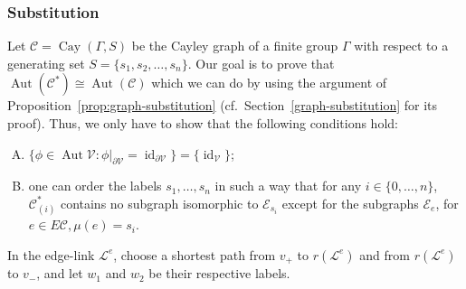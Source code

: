 \documentclass[10pt,a4paper]{amsart}
\newcommand{\cf}{cf.\ }
\theoremstyle{definition}
\newcommand{\cC}{\mathcal{C}}
\newcommand{\cL}{\mathcal{L}}
\newcommand{\cV}{\mathcal{V}}
\newcommand{\cE}{\mathcal{E}}
\DeclareMathOperator{\Cay}{Cay}
\DeclareMathOperator{\aut}{Aut}
\DeclareMathOperator{\id}{id}
\begin{document}
\subsubsection{Substitution}\label{sssection:substitution-works}

Let $\cC=\Cay({\Gamma},S)$ be the Cayley graph of a finite group ${\Gamma}$ with respect to a generating set $S= \{s_1, s_2, \dots, s_n\}$. Our goal is to prove that $\aut(\cC^{*}) \cong \aut(\cC)$ which we can do by using the argument of Proposition~\ref{prop:graph-substitution} (\cf Section~\ref{graph-substitution} for its proof). Thus, we only have to show that the following conditions hold:

\begin{enumerate}[S.\arabic*]
\item %
$\{ \phi \in \aut \cV : {\phi}|_{ {\partial}\cV } = \id _{{\partial} \cV} \} = \{ \id _{\cV} \}$;
\item %
one can order the labels $s_{1}, \dots, s_n$ in such a way that for any $i\in\{0, \dots ,n\}$, $\cC^*_{(i)}$ contains no subgraph isomorphic to $\cE_{s_{i}}$ except for the subgraphs $\cE_{e}$, for $e\in E\cC,{\mu}(e)=s_{i}$.
\end{enumerate}

In the edge-link $\cL^e$, choose a shortest path from $v_{+}$ to $r(\cL^e)$ and from $r(\cL^e)$ to $v_{-}$, and let $w_{1}$ and $w_{2}$ be their respective labels.
\end{document}
